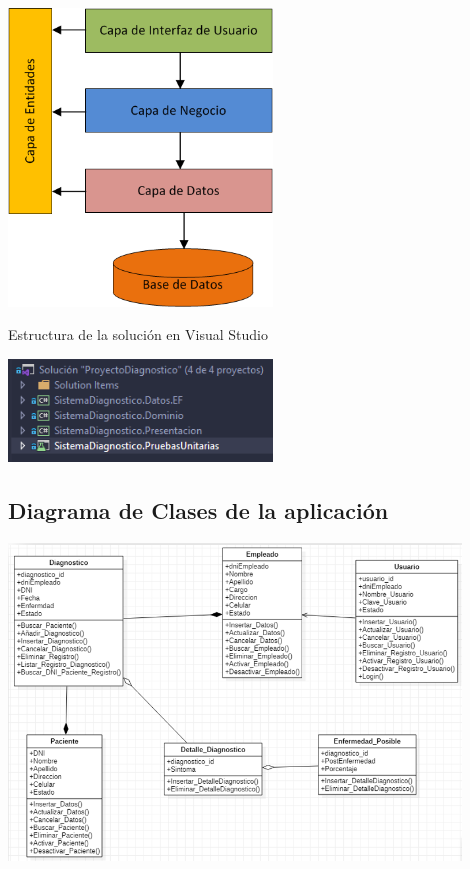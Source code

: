 \documentclass[preprint,12pt]{elsarticle}
\begin{document}
	\begin{center}
	\includegraphics[width=7cm]{./imagen/23} 
	\end{center}


Estructura de la solución en Visual Studio

\begin{center}
	\includegraphics[width=7cm]{./imagen/Screenshot_1.png}
\end{center}

\subsection{\textbf{ Diagrama de Clases de la aplicación }}
\begin{center}
	\includegraphics[width=12cm]{./imagen/diagrmclasesvistaprocesos} 
	
	\end{center}
\end{document}
